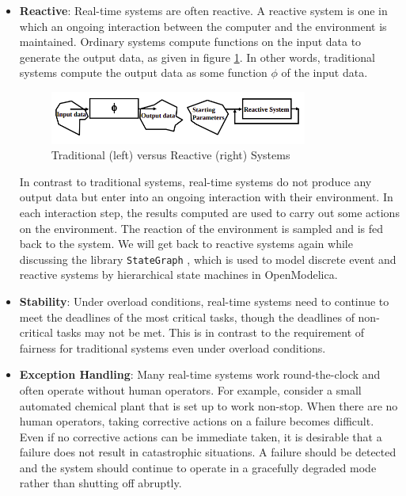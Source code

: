 \documentclass[12pt]{report}
\begin{document}
\begin{itemize}
    \item \textbf{Reactive}: Real-time systems are often reactive. A reactive system is one in which an ongoing interaction between the computer and the environment is maintained. Ordinary systems compute functions on the input data to generate the output data, as given in figure \ref{fig:trad-reac}. In other words, traditional systems compute the output data as some function $\phi$ of the input data.
    \begin{figure}[h]
    \centering
    \includegraphics[width=0.8\textwidth]{images/trad-vs-reac.png}
    \caption{Traditional (left) versus Reactive (right) Systems}
    \label{fig:trad-reac}
    \end{figure}
    
    In contrast to traditional systems, real-time systems do not produce any output data but enter into an ongoing interaction with their environment. In each interaction step, the results computed are used to carry out some actions on the environment. The reaction of the environment is sampled and is fed back to the system. We will get back to reactive systems again while discussing the library \texttt{StateGraph} \cite{stategraph}, which is used to model discrete event and reactive systems by hierarchical state machines in OpenModelica. 
    \item \textbf{Stability}: Under overload conditions, real-time systems need to continue to meet the deadlines of the most critical tasks, though the deadlines of non-critical tasks may not be met. This is in contrast to the requirement of fairness for traditional systems even under overload conditions. 
    \item \textbf{Exception Handling}: Many real-time systems work round-the-clock and often operate without human operators. For example, consider a small automated chemical plant that is set up to work non-stop. When there are no human operators, taking corrective actions on a failure becomes difficult. Even if no corrective actions can be immediate taken, it is desirable that a failure does not result in catastrophic situations. A failure should be detected and the system should continue to operate in a gracefully degraded mode rather than shutting off abruptly. 
\end{itemize}
\end{document}
